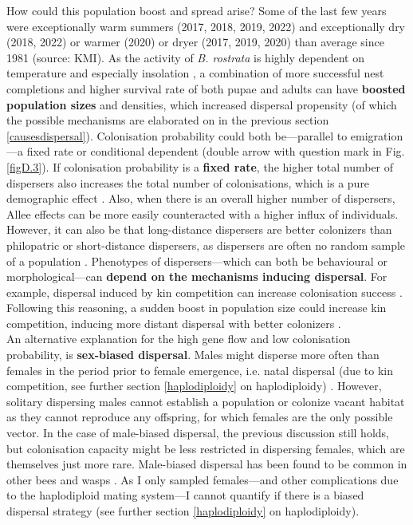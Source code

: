 \documentclass[10pt, twoside]{book} %
\begin{document}
	How could this population boost and spread arise? Some of the last few years were exceptionally warm summers (2017, 2018, 2019, 2022) and exceptionally dry (2018, 2022) or warmer (2020) or dryer (2017, 2019, 2020) than average since 1981 (source: KMI). As the activity of \textit{B. rostrata} is highly dependent on temperature and especially insolation \citep{nielsen1945, schone1992}, a combination of more successful nest completions and higher survival rate of both pupae and adults can have \textbf{boosted population sizes} and densities, which increased dispersal propensity (of which the possible mechanisms are elaborated on in the previous section \ref{causesdispersal}). Colonisation probability could both be---parallel to emigration---a fixed rate or conditional dependent (double arrow with question mark in Fig. \ref{figD.3}). If colonisation probability is a \textbf{fixed rate}, the higher total number of dispersers also increases the total number of colonisations, which is a pure demographic effect \citep{drake2022}. Also, when there is an overall higher number of dispersers, Allee effects can be more easily counteracted with a higher influx of individuals. However, it can also be that long-distance dispersers are better colonizers than philopatric or short-distance dispersers, as dispersers are often no random sample of a population \citep{bonte2009, cote2010, kisdi2012}. Phenotypes of dispersers---which can both be behavioural or morphological---can \textbf{depend on the mechanisms inducing dispersal}. For example, dispersal induced by kin competition can increase colonisation success \citep{cote2007}. Following this reasoning, a sudden boost in population size could increase kin competition, inducing more distant dispersal \citep{bitume2013} with better colonizers \citep{cote2007}.\\
	
	An alternative explanation for the high gene flow and low colonisation probability, is \textbf{sex-biased dispersal}. Males might disperse more often than females in the period prior to female emergence, i.e. natal dispersal (due to kin competition, see further section \ref{haplodiploidy} on haplodiploidy) \citep{ronce2007}. However, solitary dispersing males cannot establish a population or colonize vacant habitat as they cannot reproduce any offspring, for which females are the only possible vector. In the case of male-biased dispersal, the previous discussion still holds, but colonisation capacity might be less restricted in dispersing females, which are themselves just more rare. Male-biased dispersal has been found to be common in other bees and wasps \citep{johnstone2012}. As I only sampled females---and other complications due to the haplodiploid mating system---I cannot quantify if there is a biased dispersal strategy (see further section \ref{haplodiploidy} on haplodiploidy).\\
	
\end{document}
